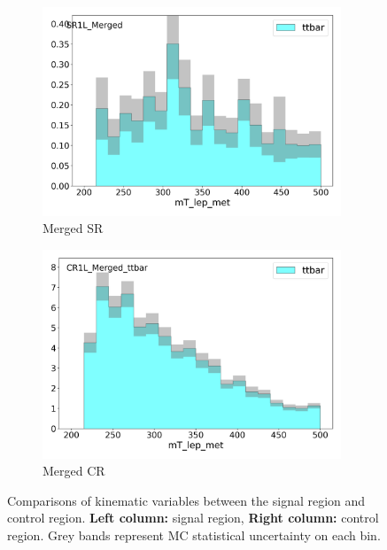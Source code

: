 \begin{figure}[htbp]
\begin{subfigure}{0.49\textwidth}
    \end{subfigure}
    \begin{subfigure}{0.49\textwidth}
    \includegraphics[width = 0.98\textwidth]{Figures/4/CRSR/SR1L_Merged/mT_lep_met.png}
    \caption{Merged SR \mtlepmet}
    \end{subfigure}
    \begin{subfigure}{0.49\textwidth}
    \includegraphics[width = 0.98\textwidth]{Figures/4/CRSR/CR1L_Merged_ttbar/mT_lep_met.png}
    \caption{Merged CR \mtlepmet}
    \end{subfigure}
    \caption{Comparisons of kinematic variables between the \merged signal region and \ttbar control region. \textbf{Left column:} signal region, \textbf{Right column:} control region. Grey bands represent MC statistical uncertainty on each bin.}
    \label{fig:CRSR_merged}
 \end{figure}

